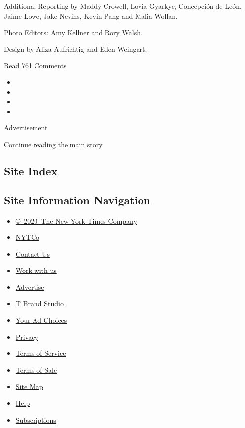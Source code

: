 Additional Reporting by Maddy Crowell, Lovia Gyarkye, Concepción de
León, Jaime Lowe, Jake Nevins, Kevin Pang and Malia Wollan.

Photo Editors: Amy Kellner and Rory Walsh.

Design by Aliza Aufrichtig and Eden Weingart.

Read 761 Comments

\begin{itemize}
\item
\item
\item
\item
\end{itemize}

Advertisement

\protect\hyperlink{after-bottom}{Continue reading the main story}

\hypertarget{site-index}{%
\subsection{Site Index}\label{site-index}}

\hypertarget{site-information-navigation}{%
\subsection{Site Information
Navigation}\label{site-information-navigation}}

\begin{itemize}
\tightlist
\item
  \href{https://help.nytimes3xbfgragh.onion/hc/en-us/articles/115014792127-Copyright-notice}{©~2020~The
  New York Times Company}
\end{itemize}

\begin{itemize}
\tightlist
\item
  \href{https://www.nytco.com/}{NYTCo}
\item
  \href{https://help.nytimes3xbfgragh.onion/hc/en-us/articles/115015385887-Contact-Us}{Contact
  Us}
\item
  \href{https://www.nytco.com/careers/}{Work with us}
\item
  \href{https://nytmediakit.com/}{Advertise}
\item
  \href{http://www.tbrandstudio.com/}{T Brand Studio}
\item
  \href{https://www.nytimes3xbfgragh.onion/privacy/cookie-policy\#how-do-i-manage-trackers}{Your
  Ad Choices}
\item
  \href{https://www.nytimes3xbfgragh.onion/privacy}{Privacy}
\item
  \href{https://help.nytimes3xbfgragh.onion/hc/en-us/articles/115014893428-Terms-of-service}{Terms
  of Service}
\item
  \href{https://help.nytimes3xbfgragh.onion/hc/en-us/articles/115014893968-Terms-of-sale}{Terms
  of Sale}
\item
  \href{https://spiderbites.nytimes3xbfgragh.onion}{Site Map}
\item
  \href{https://help.nytimes3xbfgragh.onion/hc/en-us}{Help}
\item
  \href{https://www.nytimes3xbfgragh.onion/subscription?campaignId=37WXW}{Subscriptions}
\end{itemize}
